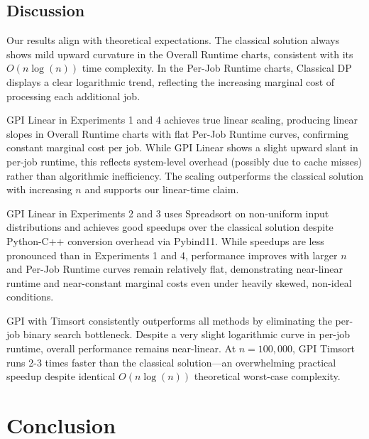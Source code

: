 \documentclass[final,5p,times]{elsarticle}
\begin{document}
\subsection{Discussion}

Our results align with theoretical expectations. The classical solution always shows mild upward curvature in the Overall Runtime charts, consistent with its $O(n \log(n))$ time complexity. In the Per-Job Runtime charts, Classical DP displays a clear logarithmic trend, reflecting the increasing marginal cost of processing each additional job.

GPI Linear in Experiments 1 and 4 achieves true linear scaling, producing linear slopes in Overall Runtime charts with flat Per-Job Runtime curves, confirming constant marginal cost per job. While GPI Linear shows a slight upward slant in per-job runtime, this reflects system-level overhead (possibly due to cache misses) rather than algorithmic inefficiency. The scaling outperforms the classical solution with increasing $n$ and supports our linear-time claim.

GPI Linear in Experiments 2 and 3 uses Spreadsort on non-uniform input distributions and achieves good speedups over the classical solution despite Python-C++ conversion overhead via Pybind11. While speedups are less pronounced than in Experiments 1 and 4, performance improves with larger $n$ and Per-Job Runtime curves remain relatively flat, demonstrating near-linear runtime and near-constant marginal costs even under heavily skewed, non-ideal conditions.

GPI with Timsort consistently outperforms all methods by eliminating the per-job binary search bottleneck. Despite a very slight logarithmic curve in per-job runtime, overall performance remains near-linear. At $n = 100{,}000$, GPI Timsort runs 2-3 times faster than the classical solution\thinspace—\thinspace an overwhelming practical speedup despite identical $O(n \log(n))$ theoretical worst-case complexity.

\section{Conclusion}
\label{sec:conclusion}
\end{document}
